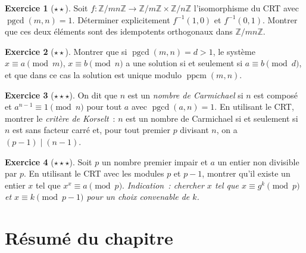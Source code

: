 \documentclass[12pt,a4paper,openany]{book}
\theoremstyle{definition}
\newtheorem{exercice}{Exercice}[chapter]
\theoremstyle{plain}
\theoremstyle{remark}
\newcommand{\Z}{\mathbb{Z}}
\DeclareMathOperator{\pgcd}{pgcd}
\DeclareMathOperator{\ppcm}{ppcm}
\begin{document}
\begin{exercice}[$\star\star$]
\label{exo:crt-5}
Soit $f : \Z/mn\Z \to \Z/m\Z \times \Z/n\Z$ l'isomorphisme du CRT
avec $\pgcd(m,n) = 1$. Déterminer explicitement $f^{-1}(1, 0)$ et
$f^{-1}(0, 1)$. Montrer que ces deux éléments sont des idempotents
orthogonaux dans $\Z/mn\Z$.
\end{exercice}

\begin{exercice}[$\star\star$]
\label{exo:crt-6}
Montrer que si $\pgcd(m, n) = d > 1$, le système
$x \equiv a \pmod{m}$, $x \equiv b \pmod{n}$ a une solution si et seulement
si $a \equiv b \pmod{d}$, et que dans ce cas la solution est unique modulo
$\ppcm(m, n)$.
\end{exercice}

\begin{exercice}[$\star\star\star$]
\label{exo:crt-7}
On dit que $n$ est un \emph{nombre de Carmichael} si $n$ est composé et
$a^{n-1} \equiv 1 \pmod{n}$ pour tout $a$ avec $\pgcd(a, n) = 1$.
En utilisant le CRT, montrer le \emph{critère de Korselt}~: $n$ est un nombre
de Carmichael si et seulement si $n$ est sans facteur carré et, pour tout
premier $p$ divisant $n$, on a $(p - 1) \mid (n - 1)$.
\end{exercice}

\begin{exercice}[$\star\star\star$]
\label{exo:crt-8}
Soit $p$ un nombre premier impair et $a$ un entier non divisible par $p$.
En utilisant le CRT avec les modules $p$ et $p-1$, montrer qu'il existe
un entier $x$ tel que $x^x \equiv a \pmod{p}$.
\textit{Indication~: chercher $x$ tel que $x \equiv g^k \pmod{p}$ et
$x \equiv k \pmod{p-1}$ pour un choix convenable de $k$.}
\end{exercice}

\section*{Résumé du chapitre}
\end{document}
